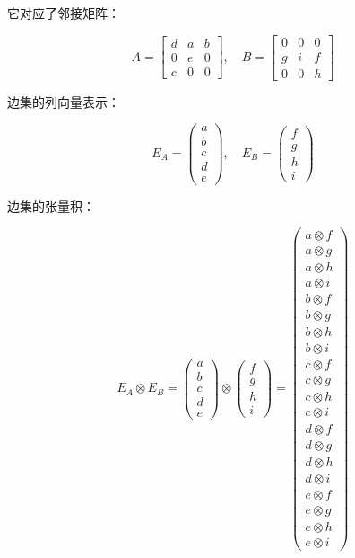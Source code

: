 \documentclass[10pt, openany]{book}
\begin{document}
它对应了邻接矩阵：

$$
A = \begin{bmatrix}
d & a & b \\
0 & e & 0 \\
c & 0 & 0
\end{bmatrix},\quad
B = \begin{bmatrix}
0 & 0 & 0 \\
g & i & f \\
0 & 0 & h
\end{bmatrix}
$$

边集的列向量表示：

\begin{equation}
E_A = \begin{pmatrix}
a \\ b \\ c \\ d \\ e
\end{pmatrix},\quad
E_B = \begin{pmatrix}
f \\ g \\ h \\ i
\end{pmatrix}
\end{equation}

边集的张量积：

\begin{equation}
E_A \otimes E_B
= \begin{pmatrix}
a \\ b \\ c \\ d \\ e
\end{pmatrix}
\otimes
\begin{pmatrix}
f \\ g \\ h \\ i
\end{pmatrix}
=\begin{pmatrix}
a \otimes f \\
a \otimes g \\
a \otimes h \\
a \otimes i \\
b \otimes f \\
b \otimes g \\
b \otimes h \\
b \otimes i \\
c \otimes f \\
c \otimes g \\
c \otimes h \\
c \otimes i \\
d \otimes f \\
d \otimes g \\
d \otimes h \\
d \otimes i \\
e \otimes f \\
e \otimes g \\
e \otimes h \\
e \otimes i
\end{pmatrix}
\end{equation}
\end{document}
